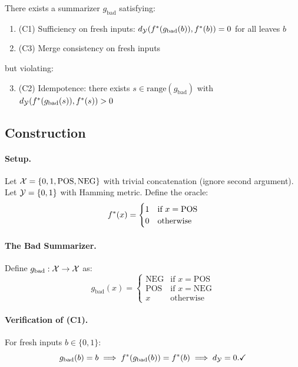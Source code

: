 \begin{theorem}[L3 is Substantive]\label{thm:l3-independent}
There exists a summarizer $g_{\text{bad}}$ satisfying:
\begin{enumerate}
    \item (C1) Sufficiency on fresh inputs: $d_{\mathcal{Y}}(f^{\ast}(g_{\text{bad}}(b)), f^{\ast}(b)) = 0$ for all leaves $b$
    \item (C3) Merge consistency on fresh inputs
\end{enumerate}
but violating:
\begin{enumerate}
    \setcounter{enumi}{2}
    \item (C2) Idempotence: there exists $s \in \text{range}(g_{\text{bad}})$ with $d_{\mathcal{Y}}(f^{\ast}(g_{\text{bad}}(s)), f^{\ast}(s)) > 0$
\end{enumerate}
\end{theorem}

\subsection{Construction}

\paragraph{Setup.}
Let $\mathcal{X} = \{0, 1, \text{POS}, \text{NEG}\}$ with trivial concatenation (ignore second argument). Let $\mathcal{Y} = \{0, 1\}$ with Hamming metric. Define the oracle:
\[
f^{\ast}(x) = \begin{cases}
1 & \text{if } x = \text{POS} \\
0 & \text{otherwise}
\end{cases}
\]

\paragraph{The Bad Summarizer.}
Define $g_{\text{bad}}: \mathcal{X} \to \mathcal{X}$ as:
\[
g_{\text{bad}}(x) = \begin{cases}
\text{NEG} & \text{if } x = \text{POS} \\
\text{POS} & \text{if } x = \text{NEG} \\
x & \text{otherwise}
\end{cases}
\]

\paragraph{Verification of (C1).}
For fresh inputs $b \in \{0, 1\}$:
\[
g_{\text{bad}}(b) = b \implies f^{\ast}(g_{\text{bad}}(b)) = f^{\ast}(b) \implies d_{\mathcal{Y}} = 0. \checkmark
\]

